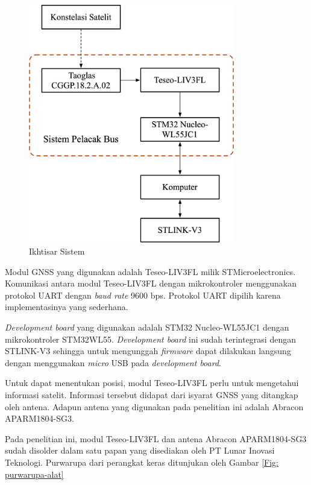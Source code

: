 \begin{figure}[H]
	\centering
	\includegraphics[width=9cm]{contents/chapter-3/system-overview.png}
	\caption{Ikhtisar Sistem}
	\label{Fig: system-overview}
\end{figure}

Modul GNSS yang digunakan adalah Teseo-LIV3FL milik STMicroelectronics. Komunikasi antara modul Teseo-LIV3FL dengan mikrokontroler menggunakan protokol UART dengan \textit{baud rate} 9600 bps. Protokol UART dipilih karena implementasinya yang sederhana. 

\textit{Development board} yang digunakan adalah STM32 Nucleo-WL55JC1 dengan mikrokontroler STM32WL55. \textit{Development board} ini sudah terintegrasi dengan STLINK-V3 sehingga untuk mengunggah \textit{firmware} dapat dilakukan langsung dengan menggunakan \textit{micro} USB pada \textit{development board}.

Untuk dapat menentukan posisi, modul Teseo-LIV3FL perlu untuk mengetahui informasi satelit. Informasi tersebut didapat dari isyarat GNSS yang ditangkap oleh antena. Adapun antena yang digunakan pada penelitian ini adalah Abracon APARM1804-SG3.

Pada penelitian ini, modul Teseo-LIV3FL dan antena Abracon APARM1804-SG3 sudah disolder dalam satu papan yang disediakan oleh PT Lunar Inovasi Teknologi. Purwarupa dari perangkat keras ditunjukan oleh Gambar \ref{Fig: purwarupa-alat}

